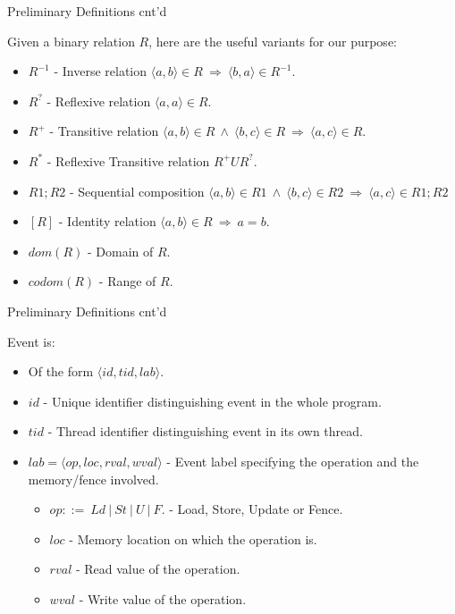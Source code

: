 \documentclass[xcolor={dvipsnames}, notes]{beamer}
\begin{document}
    \begin{frame}{Preliminary Definitions cnt'd}
        
        Given a binary relation $R$, here are the useful variants for our purpose:
        \begin{itemize}
            \item $R^{-1}$ - Inverse relation $\langle a, b\rangle \in R \ \Rightarrow \ \langle b, a\rangle \in R^{-1}$.
            \item $R^{?}$ - Reflexive relation $\langle a, a\rangle \in R$. 
            \item $R^{+}$ - Transitive relation $\langle a, b\rangle \in R \ \wedge \ \langle b, c\rangle \in R \ \Rightarrow \ \langle a, c\rangle \in R$. 
            \item $R^{*}$ - Reflexive Transitive relation $R^{+} U R^{?}$.
            \item $R1;R2$ - Sequential composition $\langle a, b\rangle \in R1 \ \wedge \ \langle b, c\rangle \in R2 \ \Rightarrow \ \langle a, c\rangle \in R1;R2$
            \item $[R]$ - Identity relation $\langle a, b\rangle \in R \ \Rightarrow \ a=b$.
            \item $dom(R)$ - Domain of $R$.
            \item $codom(R)$ - Range of $R$.
        \end{itemize}
    
    \end{frame}
    
    \begin{frame}{Preliminary Definitions cnt'd}
        
        Event is:
        \begin{itemize}
            \item Of the form $\langle id, tid, lab \rangle$.
            \item $id$ - Unique identifier distinguishing event in the whole program.
            \item $tid$ - Thread identifier distinguishing event in its own thread.
            \item $lab = \langle op, loc, rval, wval \rangle$ - Event label specifying the operation and the memory/fence involved.  
                \begin{itemize}
                    \item $op ::= \ Ld \ | \ St \ | \ U \ | \ F.$ - Load, Store, Update or Fence.
                    \item $loc$ - Memory location on which the operation is.
                    \item $rval$ - Read value of the operation.
                    \item $wval$ - Write value of the operation. 
                \end{itemize}
        \end{itemize}

    \end{frame}
    
\end{document}
